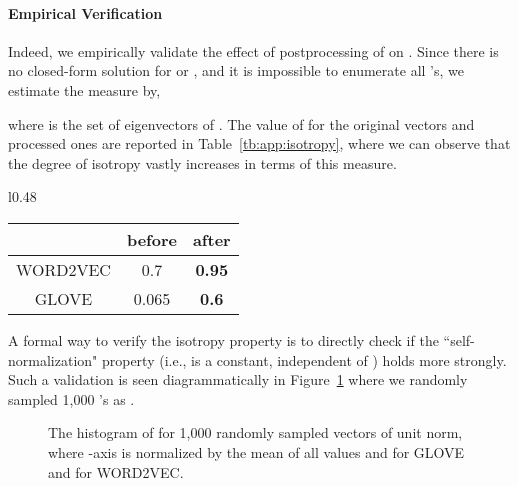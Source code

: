 \documentclass{article} \usepackage{acl2017,times}
\begin{document}
{\paragraph{Empirical Verification} Indeed, we empirically validate the effect of postprocessing of on . Since there is no closed-form solution for  or , and it is impossible to enumerate all 's, we estimate the measure by,

where  is the set of eigenvectors of . The value of  for the original vectors and processed ones are reported in Table~\ref{tb:app:isotropy}, where we can observe that the degree of isotropy vastly increases in terms of this measure.

\begin{wraptable}{l}{0.48\textwidth}
\centering
\begin{tabular}{|c|c|c|}
\hline
         & before & after         \\ \hline
WORD2VEC & 0.7    & \textbf{0.95} \\ \hline
GLOVE    & 0.065  & \textbf{0.6}  \\ \hline
\end{tabular}
\caption{Before-After on the measure of isotropy.}
\label{tb:app:isotropy}
\end{wraptable}


A formal way to verify the isotropy property is to directly check if the ``self-normalization" property (i.e.,  is a constant, independent of  \citep{andreas2015and}) holds more strongly. Such a validation is seen diagrammatically in Figure~\ref{app:fig:partition} where we randomly sampled 1,000 's as \citep{arora2015rand}.  

}

\begin{figure}[!h]
\centering
\vspace{-20pt}
\caption{The histogram of  for 1,000 randomly sampled vectors  of unit norm, where  -axis is normalized by the mean of all values and  for GLOVE and  for  WORD2VEC.}
\label{app:fig:partition}
\end{figure}
\end{document}
